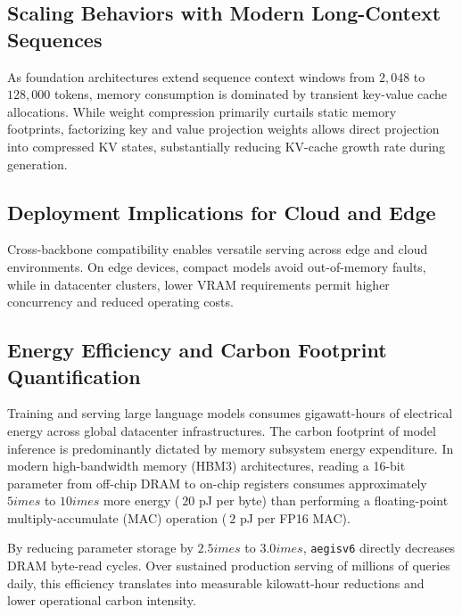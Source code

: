 \subsection{Scaling Behaviors with Modern Long-Context Sequences}
As foundation architectures extend sequence context windows from $2{,}048$ to $128{,}000$ tokens, memory consumption is dominated by transient key-value cache allocations. While weight compression primarily curtails static memory footprints, factorizing key and value projection weights allows direct projection into compressed KV states, substantially reducing KV-cache growth rate during generation.

\subsection{Deployment Implications for Cloud and Edge}
Cross-backbone compatibility enables versatile serving across edge and cloud environments. On edge devices, compact models avoid out-of-memory faults, while in datacenter clusters, lower VRAM requirements permit higher concurrency and reduced operating costs.

\subsection{Energy Efficiency and Carbon Footprint Quantification}
Training and serving large language models consumes gigawatt-hours of electrical energy across global datacenter infrastructures. The carbon footprint of model inference is predominantly dictated by memory subsystem energy expenditure. In modern high-bandwidth memory (HBM3) architectures, reading a 16-bit parameter from off-chip DRAM to on-chip registers consumes approximately $5	imes$ to $10	imes$ more energy ($~20$ pJ per byte) than performing a floating-point multiply-accumulate (MAC) operation ($~2$ pJ per FP16 MAC).

By reducing parameter storage by $2.5	imes$ to $3.0	imes$, \texttt{aegisv6} directly decreases DRAM byte-read cycles. Over sustained production serving of millions of queries daily, this efficiency translates into measurable kilowatt-hour reductions and lower operational carbon intensity.
